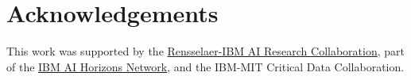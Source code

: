 \section*{Acknowledgements}

This work was supported by the \href{http://airc.rpi.edu}{Rensselaer-IBM AI Research Collaboration}, part of the \href{http://ibm.biz/AIHorizons}{IBM AI Horizons Network}, and the IBM-MIT Critical Data Collaboration.